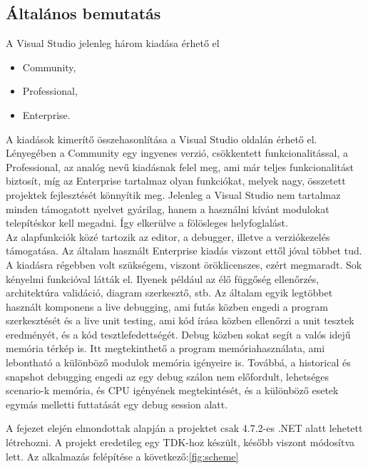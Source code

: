 \subsection{Általános bemutatás}
A Visual Studio jelenleg három kiadása érhető el 
\begin{itemize}
\item Community, 
\item Professional,
\item Enterprise.
\end{itemize}
A kiadások kimerítő összehasonlítása a Visual Studio oldalán érhető el\cite{vscompare}. Lényegében a Community egy ingyenes verzió, csökkentett funkcionalitással, a Professional, az analóg nevű kiadásnak felel meg, ami már teljes funkcionalitást biztosít, míg az Enterprise tartalmaz olyan funkciókat, melyek nagy, összetett projektek fejlesztését könnyítik meg. Jelenleg a Visual Studio nem tartalmaz minden támogatott nyelvet gyárilag, hanem a használni kívánt modulokat telepítéskor kell megadni. Így elkerülve a fölösleges helyfoglalást.\\
Az alapfunkciók közé tartozik az editor, a debugger, illetve a verziókezelés támogatása. Az általam használt Enterprise kiadás viszont ettől jóval többet tud. A kiadásra régebben volt szükségem, viszont öröklicenszes, ezért megmaradt. Sok kényelmi funkcióval látták el. Ilyenek például az élő függőség ellenőrzés, architektúra validáció, diagram szerkesztő, stb. Az általam egyik legtöbbet használt komponens a live debugging, ami futás közben engedi a program szerkesztését és a live unit testing, ami kód írása közben ellenőrzi a unit tesztek eredményét, és a kód tesztlefedettségét. Debug közben sokat segít a valós idejű memória térkép is. Itt megtekinthető a program memóriahasználata, ami lebontható a különböző modulok memória igényeire is. Továbbá, a historical és snapshot debugging engedi az egy debug szálon nem előfordult, lehetséges scenario-k memória, és CPU igényének megtekintését, és a különböző esetek egymás melletti futtatását egy debug session alatt. 

A fejezet elején elmondottak alapján a projektet csak 4.7.2-es .NET alatt lehetett létrehozni. A projekt eredetileg egy TDK-hoz készült, később viszont módosítva lett. Az alkalmazás felépítése a következő:\ref{fig:scheme} 

